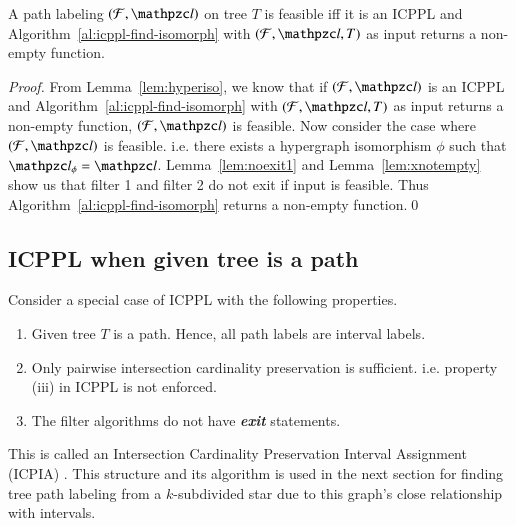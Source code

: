 \documentclass[MS]             %
              {iitmdiss}
\begin{document}
\begin{theorem}
  \label{th:charac}
  A path labeling $(\cF, \cl)$ on tree $T$ is feasible iff it is an
  ICPPL and Algorithm~\ref{al:icppl-find-isomorph} with $(\cF, \cl,
  T)$ as input returns a non-empty function.
\end{theorem}
\begin{proof}
  From Lemma~\ref{lem:hyperiso}, we know that if $(\cF, \cl)$ is an
  ICPPL and Algorithm~\ref{al:icppl-find-isomorph} with $(\cF, \cl,
  T)$ as input returns a non-empty function, $(\cF, \cl)$ is feasible.
  Now consider the case where $(\cF, \cl)$ is feasible. i.e. there
  exists a hypergraph isomorphism $\phi$ such that $\cl_\phi =
  \cl$. Lemma~\ref{lem:noexit1} and Lemma~\ref{lem:xnotempty} show us
  that filter 1 and filter 2 do not exit if input is feasible. Thus
  Algorithm~\ref{al:icppl-find-isomorph} returns a non-empty function.\qed
\end{proof}


\subsection{ICPPL when given tree is a path}
\label{subsec:icpplicpia}
\xnoindent
Consider a special case of ICPPL with the following properties.
\begin{enumerate}
\item Given tree $T$ is a path. Hence, all path labels are interval labels.
\item Only pairwise intersection cardinality
  preservation is sufficient. i.e. property (iii) in ICPPL is not enforced.
\item The filter algorithms do not have {\em \bf exit} statements.
\end{enumerate}
This is called an Intersection Cardinality Preservation Interval
Assignment (ICPIA) \cite{nsnrs09}. This structure and its algorithm is
used in the next section for finding tree path labeling from a
$k$-subdivided star due to this graph's close relationship with
intervals. 
\end{document}
